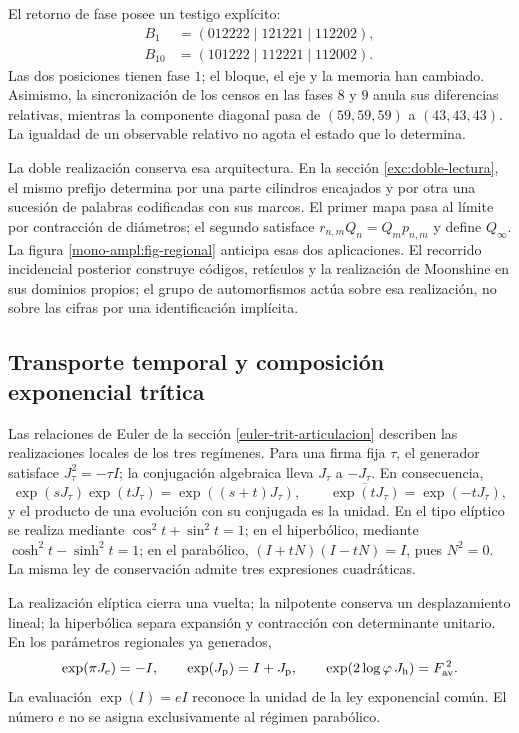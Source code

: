 El retorno de fase posee un testigo explícito:
\[
 \begin{aligned}
 B_1&=(012222\mid121221\mid112202),\\
 B_{10}&=(101222\mid112221\mid112002).
 \end{aligned}
\]
Las dos posiciones tienen fase \(1\); el bloque, el eje y la memoria han
cambiado. Asimismo, la sincronización de los censos en las fases \(8\) y
\(9\) anula sus diferencias relativas, mientras la componente diagonal
pasa de \((59,59,59)\) a \((43,43,43)\). La igualdad de un observable
relativo no agota el estado que lo determina.

La doble realización conserva esa arquitectura. En la sección
\ref{exc:doble-lectura}, el mismo prefijo determina por una parte cilindros
encajados y por otra una sucesión de palabras codificadas con sus marcos.
El primer mapa pasa al límite por contracción de diámetros; el segundo
satisface \(r_{n,m}Q_n=Q_mp_{n,m}\) y define \(Q_\infty\).
La figura \ref{mono-ampl:fig-regional} anticipa esas dos aplicaciones.
El recorrido incidencial posterior construye códigos, retículos y la
realización de Moonshine en sus dominios propios; el grupo de automorfismos
actúa sobre esa realización, no sobre las cifras por una identificación
implícita.





\subsection{Transporte temporal y composición exponencial trítica}
\label{mono-ampl:euler}

Las relaciones de Euler de la sección \ref{euler-trit-articulacion}
describen las realizaciones locales de los tres regímenes. Para una firma
fija \(\tau\), el generador satisface \(J_\tau^2=-\tau I\); la
conjugación algebraica lleva \(J_\tau\) a \(-J_\tau\). En consecuencia,
\[
 \exp(sJ_\tau)\exp(tJ_\tau)=\exp((s+t)J_\tau),\qquad
 \overline{\exp(tJ_\tau)}=\exp(-tJ_\tau),
\]
y el producto de una evolución con su conjugada es la unidad. En el tipo
elíptico se realiza mediante \(\cos^2t+\sin^2t=1\); en el hiperbólico,
mediante \(\cosh^2t-\sinh^2t=1\); en el parabólico,
\((I+tN)(I-tN)=I\), pues \(N^2=0\). La misma ley de conservación
admite tres expresiones cuadráticas.

La realización elíptica cierra una vuelta; la nilpotente conserva un
desplazamiento lineal; la hiperbólica separa expansión y contracción con
determinante unitario. En los parámetros regionales ya generados,
\[
 \exp(\pi J_{\mathrm e})=-I,\qquad
 \exp(J_{\mathrm p})=I+J_{\mathrm p},\qquad
 \exp(2\log\varphi\,J_{\mathrm h})=F_{\rm av}^{\,2}.
\]
La evaluación \(\exp(I)=eI\) reconoce la unidad de la ley exponencial
común. El número \(e\) no se asigna exclusivamente al régimen parabólico.

